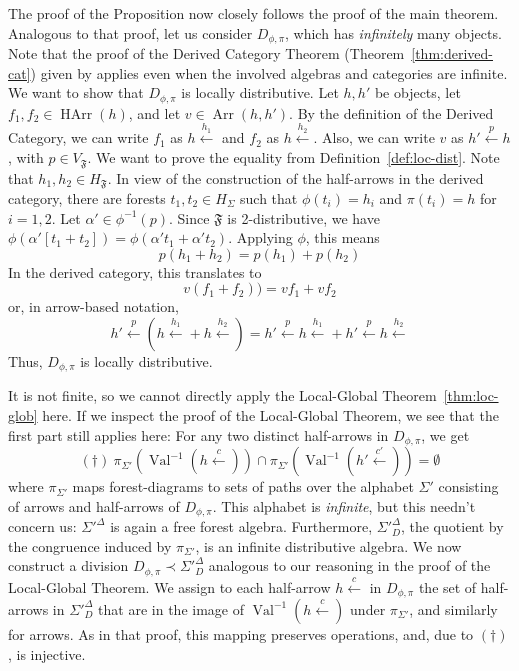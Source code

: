 \documentclass[sigplan,9pt]{acmart}\settopmatter{printfolios=true,printccs=false,printacmref=false}
\newcounter{thm}
\newcounter{theorem}
\theoremstyle{definition}
\newcommand{\Ff}[0]{{\mathfrak{F}}}
\newcommand{\carrow}[3]{#3 \xleftarrow{#2} #1 }
\newcommand{\HArr}[0]{{\operatorname{HArr}}}
\newcommand{\Arr}[0]{{\operatorname{Arr}}}
\begin{document}
The proof of the Proposition now closely follows the proof of the main theorem.
Analogous to that proof, let us consider $D_{\phi, \pi}$, which has \emph{infinitely} many objects.
Note that the proof of the Derived Category Theorem (Theorem~\ref{thm:derived-cat}) given by \cite{straubing-forest-2018} applies even when the involved algebras and categories are infinite.
We want to show that $D_{\phi,\pi}$ is locally distributive.
Let $h, h'$ be objects, let $f_1, f_2 \in \HArr(h)$, and let $v \in \Arr(h,h')$.
By the definition of the Derived Category, we can write $f_1$ as $\carrow{}{h_1}h$ and $f_2$ as $\carrow{}{h_2}h$.
Also, we can write $v$ as $\carrow{h}{p}{h'}$, with $p \in V_\Ff$.
We want to prove the equality from Definition~\ref{def:loc-dist}.
Note that $h_1, h_2 \in H_\Ff$.
In view of the construction of the half-arrows in the derived category, there are forests $t_1, t_2 \in H_\Sigma$ such that $\phi(t_i) = h_i$ and $\pi(t_i) = h$ for $i=1,2$.
Let $\alpha' \in \phi^{-1}(p)$.
Since $\Ff$ is 2-distributive, we have $\phi(\alpha'[t_1+t_2]) = \phi(\alpha' t_1 + \alpha' t_2)$.
Applying $\phi$, this means $$p(h_1+h_2) = p(h_1) + p(h_2)$$
In the derived category, this translates to $$v (f_1 + f_2)) = v f_1 + v f_2$$
or, in arrow-based notation,
$$ \carrow{(\carrow{}{h_1}h + \carrow{}{h_2}h)}{p}{h'} =  \carrow{\carrow{}{h_1}h}{p}{h'} +  \carrow{\carrow{}{h_2}h}{p}{h'}$$
Thus, $D_{\phi,\pi}$ is locally distributive.

It is not finite, so we cannot directly apply the Local-Global Theorem~\ref{thm:loc-glob} here.
If we inspect the proof of the Local-Global Theorem, we see that the first part still applies here:
For any two distinct half-arrows in $D_{\phi, \pi}$, we get $$(\dagger)\ \pi_{\Sigma'}(\operatorname{Val}^{-1}(\carrow{}{c}h)) \cap \pi_{\Sigma'}(\operatorname{Val}^{-1}(\carrow{}{c'}{h'})) = \emptyset$$
where $\pi_{\Sigma'}$ maps forest-diagrams to sets of paths over the alphabet $\Sigma'$ consisting of arrows and half-arrows of $D_{\phi,\pi}$.
This alphabet is \emph{infinite}, but this needn't concern us:
$\Sigma'^\Delta$ is again a free forest algebra.
Furthermore, $\Sigma'^\Delta_D$, the quotient by the congruence induced by $\pi_{\Sigma'}$, is an infinite distributive algebra.
We now construct a division $D_{\phi,\pi} \prec \Sigma'^\Delta_D$ analogous to our reasoning in the proof of the Local-Global Theorem.
We assign to each half-arrow $\carrow{}{c}h$ in $D_{\phi,\pi}$ the set of half-arrows in $\Sigma'^\Delta_D$ that are in the image of $\operatorname{Val}^{-1}(\carrow{}{c}h)$ under $\pi_{\Sigma'}$, and similarly for arrows.
As in that proof, this mapping preserves operations, and, due to $(\dagger)$, is injective. 
\end{document}

